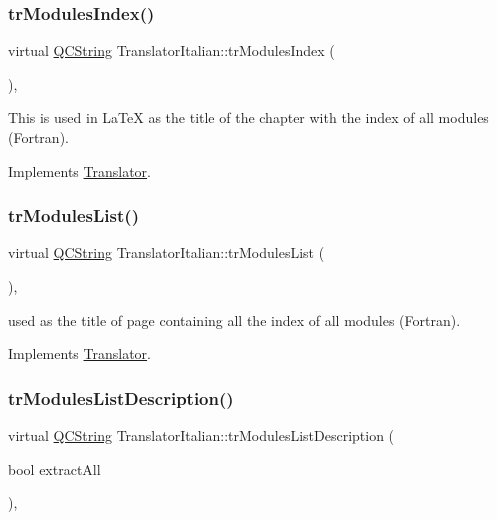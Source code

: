 \subsubsection{\texorpdfstring{trModulesIndex()}{trModulesIndex()}}
{\footnotesize\ttfamily virtual \mbox{\hyperlink{class_q_c_string}{Q\+C\+String}} Translator\+Italian\+::tr\+Modules\+Index (\begin{DoxyParamCaption}{ }\end{DoxyParamCaption})\hspace{0.3cm}{\ttfamily [inline]}, {\ttfamily [virtual]}}

This is used in La\+TeX as the title of the chapter with the index of all modules (Fortran). 

Implements \mbox{\hyperlink{class_translator}{Translator}}.

\mbox{\label{class_translator_italian_af971eb2ab94039f51ec210ae60c1f408}} 
\subsubsection{\texorpdfstring{trModulesList()}{trModulesList()}}
{\footnotesize\ttfamily virtual \mbox{\hyperlink{class_q_c_string}{Q\+C\+String}} Translator\+Italian\+::tr\+Modules\+List (\begin{DoxyParamCaption}{ }\end{DoxyParamCaption})\hspace{0.3cm}{\ttfamily [inline]}, {\ttfamily [virtual]}}

used as the title of page containing all the index of all modules (Fortran). 

Implements \mbox{\hyperlink{class_translator}{Translator}}.

\mbox{\label{class_translator_italian_a4cc931c4b131d90a2fe43aabb8ac0ea7}} 
\subsubsection{\texorpdfstring{trModulesListDescription()}{trModulesListDescription()}}
{\footnotesize\ttfamily virtual \mbox{\hyperlink{class_q_c_string}{Q\+C\+String}} Translator\+Italian\+::tr\+Modules\+List\+Description (\begin{DoxyParamCaption}\item[{bool}]{extract\+All }\end{DoxyParamCaption})\hspace{0.3cm}{\ttfamily [inline]}, {\ttfamily [virtual]}}

